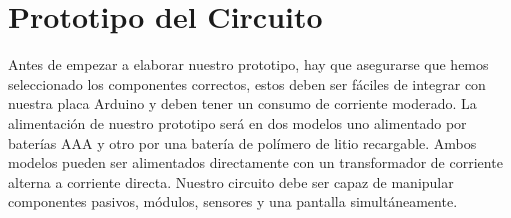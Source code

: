 \section{Prototipo del Circuito}
\par 
Antes de empezar a elaborar nuestro prototipo, hay que asegurarse que hemos seleccionado los componentes correctos, estos deben ser fáciles de integrar con nuestra placa Arduino y deben tener un consumo de corriente moderado. La alimentación de nuestro prototipo será en dos modelos uno alimentado por baterías AAA y otro por una batería de polímero de litio recargable. Ambos modelos pueden ser alimentados directamente con un transformador de corriente alterna a corriente directa. Nuestro circuito debe ser capaz de manipular componentes pasivos, módulos, sensores y una pantalla simultáneamente.



